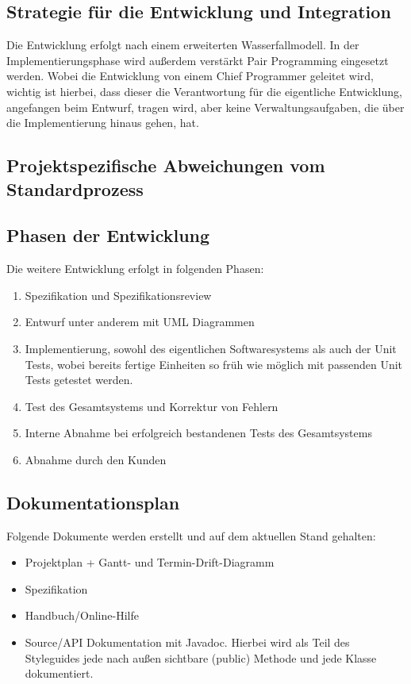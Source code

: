 \documentclass[a4paper,10pt]{scrartcl}
\begin{document}
\subsection{Strategie für die Entwicklung und Integration}
Die Entwicklung erfolgt nach einem erweiterten Wasserfallmodell.
In der Implementierungsphase wird außerdem verstärkt Pair Programming eingesetzt werden.
Wobei die Entwicklung von einem Chief Programmer geleitet wird, wichtig ist hierbei, dass dieser die Verantwortung für die eigentliche Entwicklung, angefangen beim Entwurf, tragen wird, aber keine Verwaltungsaufgaben, die über die Implementierung hinaus gehen, hat.
\subsection{Projektspezifische Abweichungen vom Standardprozess}

\subsection{Phasen der Entwicklung}
Die weitere Entwicklung erfolgt in  folgenden Phasen:
\begin{enumerate}
\item
Spezifikation und Spezifikationsreview
\item
Entwurf unter anderem mit UML Diagrammen
\item
Implementierung, sowohl des  eigentlichen Softwaresystems als auch der Unit Tests,
wobei bereits fertige Einheiten so früh wie möglich mit passenden Unit Tests getestet werden.
\item 
Test des Gesamtsystems und Korrektur von Fehlern
\item
Interne Abnahme bei erfolgreich bestandenen Tests des Gesamtsystems
\item
Abnahme durch den Kunden
\end{enumerate}
\subsection{Dokumentationsplan}
Folgende Dokumente werden erstellt und auf dem aktuellen Stand gehalten:
\begin{itemize}
\item Projektplan + Gantt- und Termin-Drift-Diagramm
\item Spezifikation
\item Handbuch/Online-Hilfe
\item Source/API Dokumentation mit Javadoc. Hierbei wird als Teil des Styleguides jede nach außen sichtbare (public) Methode und jede Klasse dokumentiert.
\end{itemize}
\end{document}

